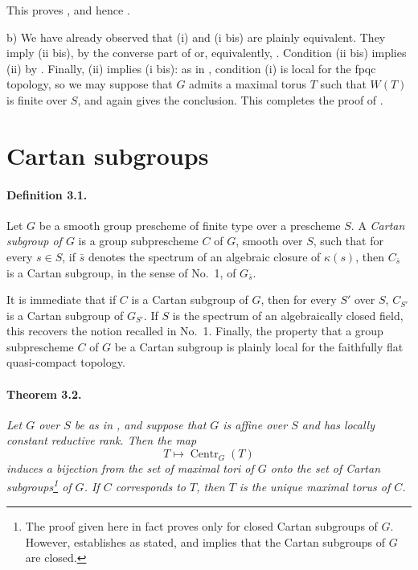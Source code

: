 This proves , and hence .

b) We have already observed that (i) and (i bis) are plainly
equivalent. They imply (ii bis), by the converse part of  or,
equivalently, . Condition (ii bis) implies (ii) by .
Finally, (ii) implies (i bis): as in , condition (i) is local
for the fpqc topology, so we may suppose that \(G\) admits a maximal
torus \(T\) such that \(W(T)\) is finite over \(S\), and 
again gives the conclusion. This completes the proof of .

\section{Cartan subgroups}

\paragraph{\textbf{Definition 3.1.}}
Let \(G\) be a smooth group prescheme of finite type over a prescheme
\(S\). A \emph{Cartan subgroup of \(G\)} is a group subprescheme
\(C\) of \(G\), smooth over \(S\), such that for every \(s\in S\), if
\(\bar s\) denotes the spectrum of an algebraic closure of
\(\kappa(s)\), then \(C_{\bar s}\) is a Cartan subgroup, in the sense
of No.~1, of \(G_{\bar s}\).

It is immediate that if \(C\) is a Cartan subgroup of \(G\), then for
every \(S'\) over \(S\), \(C_{S'}\) is a Cartan subgroup of
\(G_{S'}\). If \(S\) is the spectrum of an algebraically closed field,
this recovers the notion recalled in No.~1. Finally, the property that
a group subprescheme \(C\) of \(G\) be a Cartan subgroup is plainly
local for the faithfully flat quasi-compact topology.

\paragraph{\textbf{Theorem 3.2.}}
\emph{Let \(G\) over \(S\) be as in , and suppose that \(G\) is
affine over \(S\) and has locally constant reductive rank. Then the
map
\[
  T\longmapsto\operatorname{Centr}_G(T)
\]
induces a bijection from the set of maximal tori of \(G\) onto the set
of Cartan subgroups\footnote{The proof given here in fact proves
 only for closed Cartan subgroups of \(G\). However, 
establishes  as stated, and implies that the Cartan
subgroups of \(G\) are closed.} of \(G\). If \(C\) corresponds to
\(T\), then \(T\) is the unique maximal torus of \(C\).}


